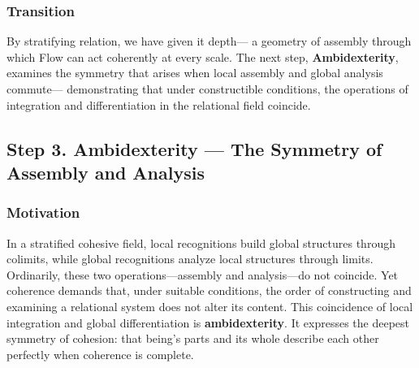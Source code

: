 \documentclass[11pt]{article}
\begin{document}
\subsubsection*{Transition}
\label{sec:org9892633}
By stratifying relation, we have given it depth—  
a geometry of assembly through which Flow can act coherently at every scale.  
The next step, \textbf{Ambidexterity}, examines the symmetry that arises  
when local assembly and global analysis commute—  
demonstrating that under constructible conditions,  
the operations of integration and differentiation in the relational field coincide.
\subsection*{Step 3. Ambidexterity — The Symmetry of Assembly and Analysis}
\label{sec:orgd91072f}

\subsubsection*{Motivation}
\label{sec:orgf0b09dc}
In a stratified cohesive field, local recognitions build global structures through colimits,  
while global recognitions analyze local structures through limits.  
Ordinarily, these two operations—assembly and analysis—do not coincide.  
Yet coherence demands that, under suitable conditions,  
the order of constructing and examining a relational system does not alter its content.  
This coincidence of local integration and global differentiation is \textbf{ambidexterity}.  
It expresses the deepest symmetry of cohesion:  
that being’s parts and its whole describe each other perfectly when coherence is complete.
\end{document}
